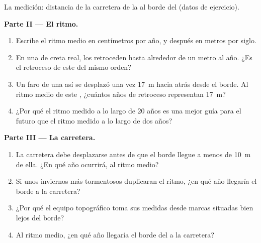 \begin{problem}
\begin{omfigure}
{\small La medición: distancia de la carretera de la  al borde del
 (datos de ejercicio).}
\label{fig:g9:landforms:survey}
\end{omfigure}

\noindent\textbf{Parte II --- El ritmo.}\par\nopagebreak
\begin{enumerate}[resume, beginpenalty=10000]
  \item Escribe el ritmo medio en centímetros por año, y después en metros
        por siglo.
  \item En una  de creta real, los  retroceden hasta
        alrededor de un metro al año. ¿Es el retroceso de este 
        del mismo orden?
  \item Un faro de una  así se desplazó una vez \qty{17}{m} hacia
        atrás desde el borde. Al ritmo medio de este , ¿cuántos
        años de retroceso representan \qty{17}{m}?
  \item ¿Por qué el ritmo medido a lo largo de 20 años es una mejor guía
        para el futuro que el ritmo medido a lo largo de dos años?
\end{enumerate}

\noindent\textbf{Parte III --- La carretera.}\par\nopagebreak
\begin{enumerate}[resume, beginpenalty=10000]
  \item La carretera debe desplazarse antes de que el borde llegue a menos
        de \qty{10}{m} de ella. ¿En qué año ocurrirá, al ritmo medio?
  \item Si unos inviernos más tormentosos duplicaran el ritmo, ¿en qué año
        llegaría el borde a la carretera?
  \item ¿Por qué el equipo topográfico toma sus medidas desde marcas
        situadas bien lejos del borde?
  \item Al ritmo medio, ¿en qué año llegaría el borde del  a la
        carretera?
\end{enumerate}
\end{problem}

